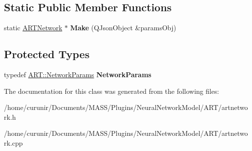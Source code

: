 \subsection*{Static Public Member Functions}
\begin{DoxyCompactItemize}
\item 
static \hyperlink{class_a_r_t_network}{A\+R\+T\+Network} $\ast$ {\bfseries Make} (Q\+Json\+Object \&params\+Obj)\hypertarget{class_a_r_t_network_acc61c58d3082855607710e0f5266738c}{}\label{class_a_r_t_network_acc61c58d3082855607710e0f5266738c}

\end{DoxyCompactItemize}
\subsection*{Protected Types}
\begin{DoxyCompactItemize}
\item 
typedef \hyperlink{struct_a_r_t_1_1_network_params}{A\+R\+T\+::\+Network\+Params} {\bfseries Network\+Params}\hypertarget{class_a_r_t_network_a71deee5d6ab1571d49a259123c75dd12}{}\label{class_a_r_t_network_a71deee5d6ab1571d49a259123c75dd12}

\end{DoxyCompactItemize}


The documentation for this class was generated from the following files\+:\begin{DoxyCompactItemize}
\item 
/home/curunir/\+Documents/\+M\+A\+S\+S/\+Plugins/\+Neural\+Network\+Model/\+A\+R\+T/artnetwork.\+h\item 
/home/curunir/\+Documents/\+M\+A\+S\+S/\+Plugins/\+Neural\+Network\+Model/\+A\+R\+T/artnetwork.\+cpp\end{DoxyCompactItemize}
